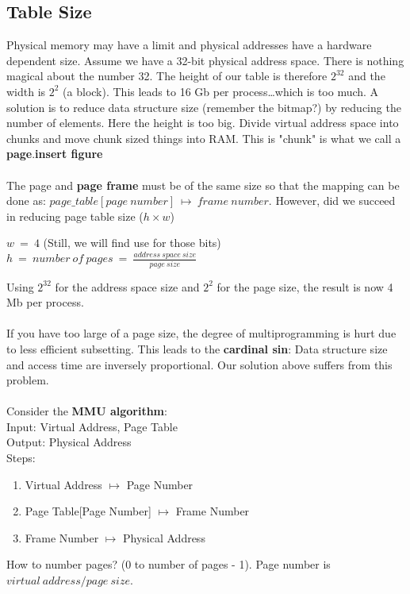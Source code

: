 \documentclass[../base_file/cs1550_notes.tex]{subfiles}
\begin{document}
\subsection{Table Size}
Physical memory may have a limit and physical addresses have a hardware dependent size.  Assume we have
a 32-bit physical address space.  There is nothing magical about the number 32. The height of our table
is therefore $2^{32}$ and the width is $2^{2}$ (a block).  This leads to 16 Gb per process\dots which is too much.
A solution is to reduce data structure size (remember the bitmap?) by reducing the number of elements.
Here the height is too big.  Divide virtual address space into chunks and move chunk sized things into RAM\@. 
This is "chunk" is what we call a \textbf{page}.\textbf{insert figure}\\\\
The page and \textbf{page frame} must be of the same size so that the mapping can be done as:
$page\_table[page\ number]\ \longmapsto\ frame\ number$.  However, did we succeed in reducing page table size ($h\times w$)
\begin{center}
	$w\ =\ 4$ (Still, we will find use for those bits)\\
	$h\ =\ number\ of\ pages\ =\ \frac{address\ space\ size}{page\ size}$
\end{center}
Using $2^{32}$ for the address space size and $2^{2}$ for the page size, the result is now 4 Mb per process.\\\\
If you have too large of a page size, the degree of multiprogramming is hurt due to less efficient subsetting.
This leads to the \textbf{cardinal sin}: Data structure size and access time are inversely proportional.  Our 
solution above suffers from this problem.\\\\
\newpage
Consider the \textbf{MMU algorithm}:\\
Input: Virtual Address, Page Table\\
Output: Physical Address\\
Steps:
\begin{enumerate}
	\item Virtual Address $\longmapsto$ Page Number
	\item Page Table[Page Number] $\longmapsto$ Frame Number
	\item Frame Number $\longmapsto$ Physical Address
\end{enumerate}
How to number pages? (0 to number of pages - 1).  Page number is $virtual\ address/page\ size$.\\
\end{document}
